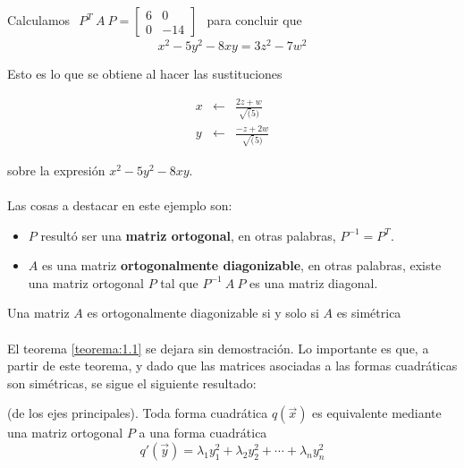 \begin{example}
Calculamos $ \begin{matrix} 
    P^{T}~A~P = \begin{bmatrix}
6 & 0\\
0 & -14
\end{bmatrix}
    \end{matrix}$ para concluir que 
\begin{equation*}
x^{2} - 5y^{2} - 8xy = 3z^{2} - 7w^{2}
\end{equation*}

Esto es lo que se obtiene al hacer las sustituciones 

\begin{eqnarray*}
x & \leftarrow & \frac{2z + w}{\sqrt(5)}\\
y & \leftarrow & \frac{-z + 2w}{\sqrt(5)}
\end{eqnarray*}

sobre la expresión $x^{2} - 5y^{2} - 8xy$.
\end{example}

\paragraph*{}
Las cosas a destacar en este ejemplo son:
\begin{itemize}
    \item $P$ resultó ser una \textbf{matriz ortogonal}, en otras palabras, $P^{-1} = P^{T}$.
    \item $A$ es una matriz \textbf{ortogonalmente diagonizable}, en otras palabras, existe una matriz ortogonal $P$ tal que $P^{-1}~A~P$ es una matriz diagonal.
\end{itemize}

\begin{theorem}
Una matriz $A$ es ortogonalmente diagonizable si y solo si $A$ es simétrica
\label{teorema:1.1}
\end{theorem}

\paragraph*{}
El teorema \ref{teorema:1.1} se dejara sin demostración. Lo importante es que, a partir de este teorema, y dado que las matrices asociadas a las formas cuadráticas son simétricas, se sigue el siguiente resultado:

\begin{theorem}(de los ejes principales).
Toda forma cuadrática $q(\overrightarrow{x})$ es equivalente mediante una matriz ortogonal $P$ a una forma cuadrática 
\begin{equation}
    q'(\overrightarrow{y}) = \lambda_{1}y_{1}^{2} + \lambda_{2}y_{2}^{2} + \cdots + \lambda_{n}y_{n}^{2}
\end{equation}
\label{teorema:1.2}
\end{theorem}

